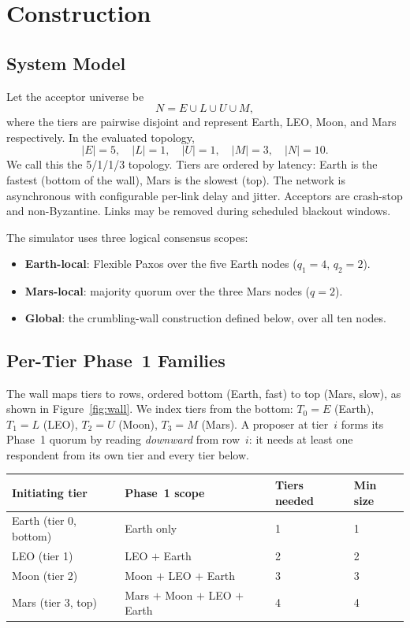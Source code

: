 \documentclass[11pt]{article}
\begin{document}
\section{Construction}
\label{sec:construction}

\subsection{System Model}
Let the acceptor universe be
\[
N = E \cup L \cup U \cup M,
\]
where the tiers are pairwise disjoint and represent Earth, LEO, Moon, and Mars respectively. In the evaluated topology,
\[
|E| = 5,\quad |L| = 1,\quad |U| = 1,\quad |M| = 3,\quad |N| = 10.
\]
We call this the 5/1/1/3 topology. Tiers are ordered by latency: Earth is the fastest (bottom of the wall), Mars is the slowest (top). The network is asynchronous with configurable per-link delay and jitter. Acceptors are crash-stop and non-Byzantine. Links may be removed during scheduled blackout windows.

The simulator uses three logical consensus scopes:
\begin{itemize}
\item \textbf{Earth-local}: Flexible Paxos over the five Earth nodes ($q_1 = 4$, $q_2 = 2$).
\item \textbf{Mars-local}: majority quorum over the three Mars nodes ($q = 2$).
\item \textbf{Global}: the crumbling-wall construction defined below, over all ten nodes.
\end{itemize}

\subsection{Per-Tier Phase~1 Families}

The wall maps tiers to rows, ordered bottom (Earth, fast) to top (Mars, slow), as shown in Figure~\ref{fig:wall}. We index tiers from the bottom: $T_0 = E$ (Earth), $T_1 = L$ (LEO), $T_2 = U$ (Moon), $T_3 = M$ (Mars). A proposer at tier~$i$ forms its Phase~1 quorum by reading \emph{downward} from row~$i$: it needs at least one respondent from its own tier and every tier below.

\begin{center}
\small
\begin{tabular}{llll}
\toprule
Initiating tier & Phase~1 scope & Tiers needed & Min size \\
\midrule
Earth (tier 0, bottom) & Earth only & 1 & 1 \\
LEO (tier 1) & LEO $+$ Earth & 2 & 2 \\
Moon (tier 2) & Moon $+$ LEO $+$ Earth & 3 & 3 \\
Mars (tier 3, top) & Mars $+$ Moon $+$ LEO $+$ Earth & 4 & 4 \\
\bottomrule
\end{tabular}
\end{center}
\end{document}
